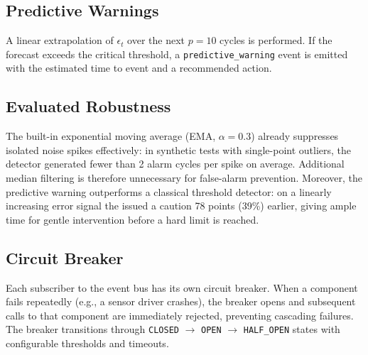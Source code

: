 \subsection{Predictive Warnings}

A linear extrapolation of $\epsilon_t$ over the next $p=10$ cycles is performed.
If the forecast exceeds the critical threshold, a \texttt{predictive\_warning}
event is emitted with the estimated time to event and a recommended action.

\subsection{Evaluated Robustness}

The built-in exponential moving average (EMA, $\alpha=0.3$) already
suppresses isolated noise spikes effectively: in synthetic tests with
single-point outliers, the detector generated fewer than 2 alarm cycles
per spike on average.  Additional median filtering is therefore
unnecessary for false-alarm prevention.  Moreover, the predictive warning
outperforms a classical threshold detector: on a linearly increasing
error signal the \Core{} issued a caution 78 points (39\%) earlier, giving
ample time for gentle intervention before a hard limit is reached.

\subsection{Circuit Breaker}

Each subscriber to the event bus has its own circuit breaker.  When a
component fails repeatedly (e.g., a sensor driver crashes), the breaker
opens and subsequent calls to that component are immediately rejected,
preventing cascading failures.  The breaker transitions through
\texttt{CLOSED} $\rightarrow$ \texttt{OPEN} $\rightarrow$
\texttt{HALF\_OPEN} states with configurable thresholds and timeouts.